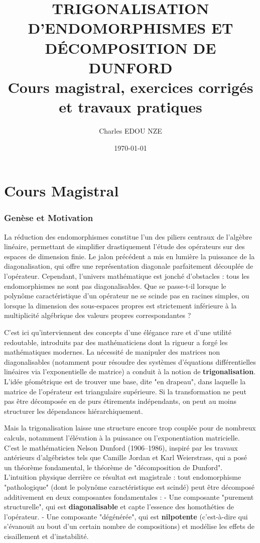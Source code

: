 \documentclass[11pt,a4paper]{article}
\title{\Huge TRIGONALISATION D'ENDOMORPHISMES ET DÉCOMPOSITION DE DUNFORD \\ \large Cours magistral, exercices corrigés et travaux pratiques}
\author{\Large Charles EDOU NZE}
\date{\today}
\begin{document}
\maketitle
\tableofcontents
\newpage
\part{Cours Magistral}




\section{Genèse et Motivation}

La réduction des endomorphismes constitue l'un des piliers centraux de l'algèbre linéaire, permettant de simplifier drastiquement l'étude des opérateurs sur des espaces de dimension finie. Le jalon précédent a mis en lumière la puissance de la diagonalisation, qui offre une représentation diagonale parfaitement découplée de l'opérateur. Cependant, l'univers mathématique est jonché d'obstacles : tous les endomorphismes ne sont pas diagonalisables. Que se passe-t-il lorsque le polynôme caractéristique d'un opérateur ne se scinde pas en racines simples, ou lorsque la dimension des sous-espaces propres est strictement inférieure à la multiplicité algébrique des valeurs propres correspondantes ?

C'est ici qu'interviennent des concepts d'une élégance rare et d'une utilité redoutable, introduits par des mathématiciens dont la rigueur a forgé les mathématiques modernes. La nécessité de manipuler des matrices non diagonalisables (notamment pour résoudre des systèmes d'équations différentielles linéaires via l'exponentielle de matrice) a conduit à la notion de \textbf{trigonalisation}. L'idée géométrique est de trouver une base, dite "en drapeau", dans laquelle la matrice de l'opérateur est triangulaire supérieure. Si la transformation ne peut pas être décomposée en de purs étirements indépendants, on peut au moins structurer les dépendances hiérarchiquement.

Mais la trigonalisation laisse une structure encore trop couplée pour de nombreux calculs, notamment l'élévation à la puissance ou l'exponentiation matricielle. C'est le mathématicien Nelson Dunford (1906–1986), inspiré par les travaux antérieurs d'algébristes tels que Camille Jordan et Karl Weierstrass, qui a posé un théorème fondamental, le théorème de "décomposition de Dunford". L'intuition physique derrière ce résultat est magistrale : tout endomorphisme "pathologique" (dont le polynôme caractéristique est scindé) peut être décomposé additivement en deux composantes fondamentales :
- Une composante "purement structurelle", qui est \textbf{diagonalisable} et capte l'essence des homothéties de l'opérateur.
- Une composante "dégénérée", qui est \textbf{nilpotente} (c'est-à-dire qui s'évanouit au bout d'un certain nombre de compositions) et modélise les effets de cisaillement et d'instabilité.
\end{document}

